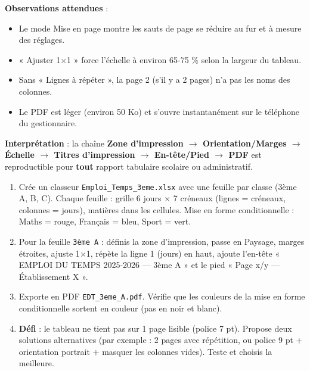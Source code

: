 \documentclass[11pt]{article}
\begin{document}
\begin{experience}
\textbf{Observations attendues} :
\begin{itemize}
  \item Le mode Mise en page montre les sauts de page se réduire au fur et à mesure des réglages.
  \item « Ajuster 1$\times$1 » force l'échelle à environ 65-75 \% selon la largeur du tableau.
  \item Sans « Lignes à répéter », la page 2 (s'il y a 2 pages) n'a pas les noms des colonnes.
  \item Le PDF est léger (environ 50 Ko) et s'ouvre instantanément sur le téléphone du gestionnaire.
\end{itemize}

\textbf{Interprétation} : la chaîne \textbf{Zone d'impression $\rightarrow$ Orientation/Marges $\rightarrow$ Échelle $\rightarrow$ Titres d'impression $\rightarrow$ En-tête/Pied $\rightarrow$ PDF} est reproductible pour \textbf{tout} rapport tabulaire scolaire ou administratif.
\end{experience}

\begin{exercice}
\begin{enumerate}
  \item Crée un classeur \texttt{Emploi\_Temps\_3eme.xlsx} avec une feuille par classe (3ème A, B, C). Chaque feuille : grille 6 jours $\times$ 7 créneaux (lignes = créneaux, colonnes = jours), matières dans les cellules. Mise en forme conditionnelle : Maths = rouge, Français = bleu, Sport = vert.
  \item Pour la feuille \texttt{3ème A} : définis la zone d'impression, passe en Paysage, marges étroites, ajuste 1$\times$1, répète la ligne 1 (jours) en haut, ajoute l'en-tête « EMPLOI DU TEMPS 2025-2026 — 3ème A » et le pied « Page x/y — Établissement X ».
  \item Exporte en PDF \texttt{EDT\_3eme\_A.pdf}. Vérifie que les couleurs de la mise en forme conditionnelle sortent en couleur (pas en noir et blanc).
  \item \textbf{Défi} : le tableau ne tient pas sur 1 page lisible (police 7 pt). Propose deux solutions alternatives (par exemple : 2 pages avec répétition, ou police 9 pt + orientation portrait + masquer les colonnes vides). Teste et choisis la meilleure.
\end{enumerate}
\end{exercice}
\end{document}
